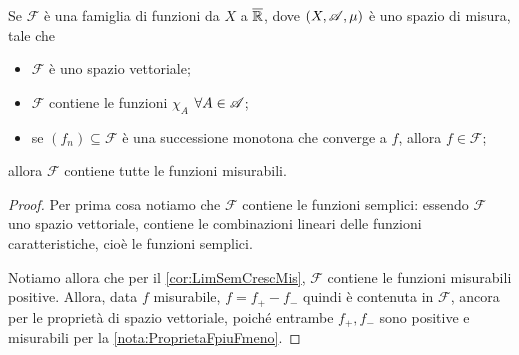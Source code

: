 \begin{theorem}\label{thm:ChiusuraMonotonaFunzioni}
	Se $\mathcal F$ è una famiglia di funzioni da $X$ a $\overline{\mathbb R}$, dove $(X,\mathscr A,\mu)$ è uno spazio di misura, tale che
	\begin{itemize}
	 \item $\mathcal F$ è uno spazio vettoriale;
	 \item $\mathcal F$ contiene le funzioni $\chi_A$ $\forall A\in \mathscr A$;
	 \item se $(f_n)\subseteq \mathcal F$ è una successione monotona che converge a $f$, allora $f\in \mathcal F$;
	\end{itemize}
	allora $\mathcal F$ contiene tutte le funzioni misurabili.
\end{theorem}
\begin{proof}
	Per prima cosa notiamo che $\mathcal F$ contiene le funzioni semplici: essendo $\mathcal F$ uno spazio vettoriale, contiene le combinazioni
	lineari delle funzioni caratteristiche, cioè le funzioni semplici.
	
	Notiamo allora che per il \cref{cor:LimSemCrescMis}, $\mathcal F$ contiene le funzioni misurabili positive. Allora, data $f$ misurabile,
	$f = f_+-f_-$ quindi è contenuta in $\mathcal F$, ancora per le proprietà di spazio vettoriale, poiché entrambe $f_+,f_-$ sono
	positive e misurabili per la \cref{nota:ProprietaFpiuFmeno}.
\end{proof}
